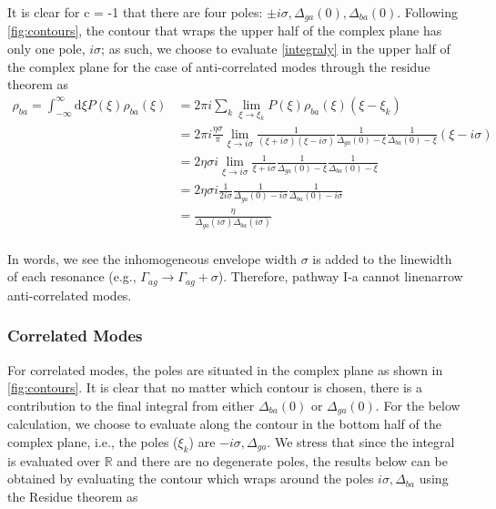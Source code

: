 \documentclass[aip, jcp, draft, onecolumn]{revtex4-2}
\begin{document}
\begin{widetext}
It is clear for c = -1 that there are four poles: $\pm i \sigma, \Delta_{ga}(0), \Delta_{ba}(0)$. 
Following \autoref{fig:contours}, the contour that wraps the upper half of the complex plane has only one pole, $i \sigma$; as such, we choose to evaluate \autoref{integraly} in the upper half of the complex plane for the case of anti-correlated modes through the residue theorem as
	\begin{equation}
		\begin{split}
			\rho_{ba} = \int_{-\infty}^\infty \mathrm{d}\xi P(\xi) \rho_{ba}(\xi) &= 2\pi i \sum_k \lim_{\xi \rightarrow \xi_k} P(\xi) \rho_{ba}(\xi) (\xi - \xi_k)\\
			&= 2\pi i \frac{\eta \sigma}{\pi} \lim_{\xi \rightarrow i\sigma} \frac{1}{(\xi + i\sigma)(\xi - i\sigma)} \frac{1}{\Delta_{ga}(0) - \xi} \frac{1}{\Delta_{ba}(0) - \xi} (\xi - i \sigma)\\
			&= 2 \eta \sigma i \lim_{\xi \rightarrow i\sigma} \frac{1}{\xi + i\sigma} \frac{1}{\Delta_{ga}(0) - \xi} \frac{1}{\Delta_{ba}(0) - \xi}\\
			&= 2\eta \sigma i \frac{1}{2i\sigma} \frac{1}{\Delta_{ga}(0) - i\sigma} \frac{1}{\Delta_{ba}(0) - i\sigma}\\
			&= \frac{\eta}{\Delta_{ga}(i\sigma)\Delta_{ba}(i \sigma)}\\
		\end{split}
	\end{equation}


In words, we see the inhomogeneous envelope width $\sigma$ is added to the linewidth of each resonance (e.g., $\Gamma_{ag} \rightarrow \Gamma_{ag} + \sigma$).
Therefore, pathway I-a cannot linenarrow anti-correlated modes. 
\subsubsection{Correlated Modes}
For correlated modes, the poles are situated in the complex plane as shown in \autoref{fig:contours}.
It is clear that no matter which contour is chosen, there is a contribution to the final integral from either $\Delta_{ba}(0)$ or $\Delta_{ga}(0)$. 
For the below calculation, we choose to evaluate along the contour in the bottom half of the complex plane, i.e., the poles ($\xi_k$) are $-i\sigma, \Delta_{ga}$.
We stress that since the integral is evaluated over $\mathbb{R}$ and there are no degenerate poles, the results below can be obtained by evaluating the contour which wraps around the poles $i\sigma, \Delta_{ba}$ using the Residue theorem as 


\end{widetext}
\end{document}
